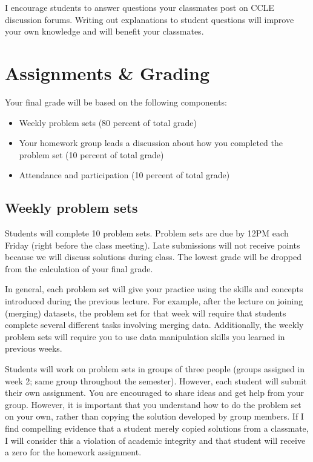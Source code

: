 \documentclass[11pt,]{article}
\providecommand{\tightlist}{%
  \setlength{\itemsep}{0pt}\setlength{\parskip}{0pt}}
\begin{document}
I encourage students to answer questions your classmates post on CCLE
discussion forums. Writing out explanations to student questions will
improve your own knowledge and will benefit your classmates.

\section{Assignments \& Grading}\label{assignments-grading}

Your final grade will be based on the following components:

\begin{itemize}
\tightlist
\item
  Weekly problem sets (80 percent of total grade)
\item
  Your homework group leads a discussion about how you completed the
  problem set (10 percent of total grade)
\item
  Attendance and participation (10 percent of total grade)
\end{itemize}

\subsection{Weekly problem sets}\label{weekly-problem-sets}

Students will complete 10 problem sets. Problem sets are due by 12PM
each Friday (right before the class meeting). Late submissions will not
receive points because we will discuss solutions during class. The
lowest grade will be dropped from the calculation of your final grade.

In general, each problem set will give your practice using the skills
and concepts introduced during the previous lecture. For example, after
the lecture on joining (merging) datasets, the problem set for that week
will require that students complete several different tasks involving
merging data. Additionally, the weekly problem sets will require you to
use data manipulation skills you learned in previous weeks.

Students will work on problem sets in groups of three people (groups
assigned in week 2; same group throughout the semester). However, each
student will submit their own assignment. You are encouraged to share
ideas and get help from your group. However, it is important that you
understand how to do the problem set on your own, rather than copying
the solution developed by group members. If I find compelling evidence
that a student merely copied solutions from a classmate, I will consider
this a violation of academic integrity and that student will receive a
zero for the homework assignment.
\end{document}
